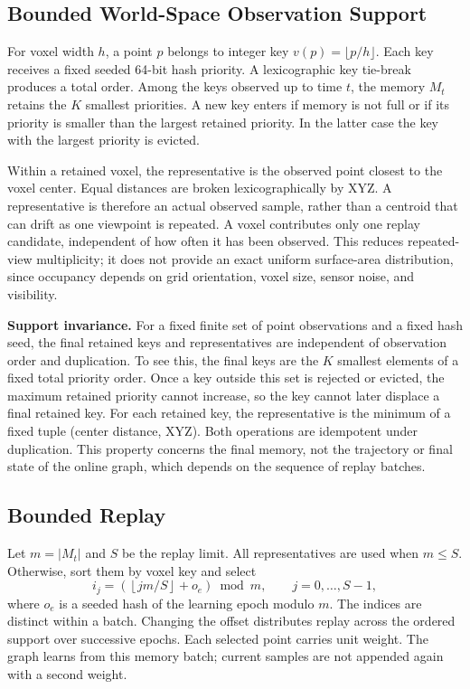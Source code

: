 \documentclass[letterpaper,10pt,conference]{template/ieeeconf}
\begin{document}
\subsection{Bounded World-Space Observation Support}
For voxel width $h$, a point $p$ belongs to integer key $v(p)=\lfloor p/h\rfloor$. Each key receives a fixed seeded 64-bit hash priority. A lexicographic key tie-break produces a total order. Among the keys observed up to time $t$, the memory $M_t$ retains the $K$ smallest priorities. A new key enters if memory is not full or if its priority is smaller than the largest retained priority. In the latter case the key with the largest priority is evicted.

Within a retained voxel, the representative is the observed point closest to the voxel center. Equal distances are broken lexicographically by XYZ. A representative is therefore an actual observed sample, rather than a centroid that can drift as one viewpoint is repeated. A voxel contributes only one replay candidate, independent of how often it has been observed. This reduces repeated-view multiplicity; it does not provide an exact uniform surface-area distribution, since occupancy depends on grid orientation, voxel size, sensor noise, and visibility.

\textbf{Support invariance.} For a fixed finite set of point observations and a fixed hash seed, the final retained keys and representatives are independent of observation order and duplication. To see this, the final keys are the $K$ smallest elements of a fixed total priority order. Once a key outside this set is rejected or evicted, the maximum retained priority cannot increase, so the key cannot later displace a final retained key. For each retained key, the representative is the minimum of a fixed tuple (center distance, XYZ). Both operations are idempotent under duplication. This property concerns the final memory, not the trajectory or final state of the online graph, which depends on the sequence of replay batches.

\subsection{Bounded Replay}
Let $m=|M_t|$ and $S$ be the replay limit. All representatives are used when $m\leq S$. Otherwise, sort them by voxel key and select
\begin{equation}
 i_j=\left(\left\lfloor jm/S\right\rfloor+o_e\right)\bmod m,
 \qquad j=0,\ldots,S-1,
\end{equation}
where $o_e$ is a seeded hash of the learning epoch modulo $m$. The indices are distinct within a batch. Changing the offset distributes replay across the ordered support over successive epochs. Each selected point carries unit weight. The graph learns from this memory batch; current samples are not appended again with a second weight.
\end{document}
